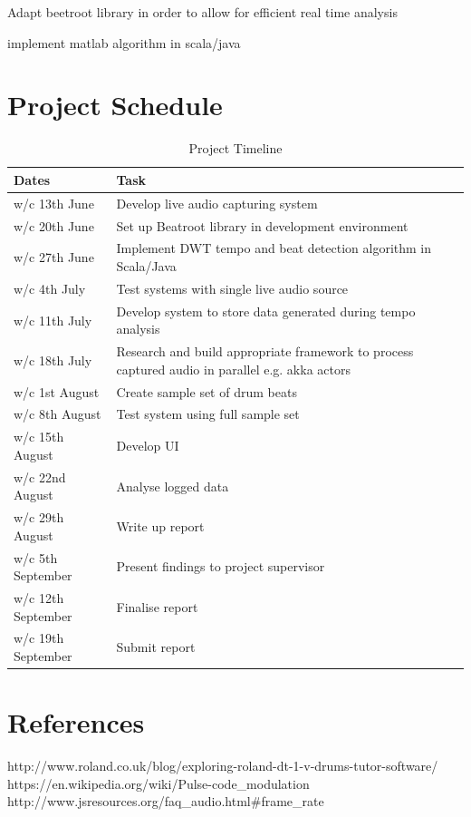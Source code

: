 \documentclass[a4paper, 11pt]{article}
\begin{document}
Adapt beetroot library in order to allow for efficient real time analysis

implement matlab algorithm in scala/java


\maketitle{} 
\section{Project Schedule}

\begin{table}[H]
\caption{Project Timeline} 
\centering
\begin{tabular}{|p{4cm}|p{8cm}|}
 \hline
\textbf{Dates} & \textbf{Task}\\ [0.5ex]
\hline 
w/c 13th June & Develop live audio capturing system\\
\hline 
w/c 20th June & Set up Beatroot library in development environment\\
\hline 
w/c 27th June & Implement DWT tempo and beat detection algorithm in Scala/Java\\
\hline 
w/c 4th July & Test systems with single live audio source\\
\hline 
w/c 11th July & Develop system to store data generated during tempo analysis\\
\hline 
w/c 18th July & Research and build appropriate framework to process captured audio in parallel e.g. akka actors\\
\hline 
w/c 1st August & Create sample set of drum beats\\
\hline 
w/c 8th August & Test system using full sample set\\
\hline 
w/c 15th August & Develop UI\\
\hline 
w/c 22nd August & Analyse logged data\\
\hline 
w/c 29th August & Write up report\\
\hline 
w/c 5th September & Present findings to project supervisor\\
\hline 
w/c 12th September & Finalise report\\
\hline 
w/c 19th September & Submit report\\
\hline
\end{tabular}
\end{table}

\maketitle{} 
\section{References}
http://www.roland.co.uk/blog/exploring-roland-dt-1-v-drums-tutor-software/
https://en.wikipedia.org/wiki/Pulse-code_modulation
http://www.jsresources.org/faq_audio.html#frame_rate
\end{document}
